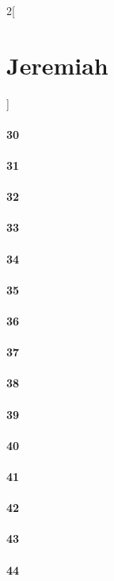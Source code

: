 \documentclass{book}
\begin{document}
\begin{multicols}{2}[\part{Jeremiah}]
\subsection*{30}
\subsection*{31}
\subsection*{32}
\subsection*{33}
\subsection*{34}
\subsection*{35}
\subsection*{36}
\subsection*{37}
\subsection*{38}
\subsection*{39}
\subsection*{40}
\subsection*{41}
\subsection*{42}
\subsection*{43}
\subsection*{44}

\end{multicols}
\end{document}
